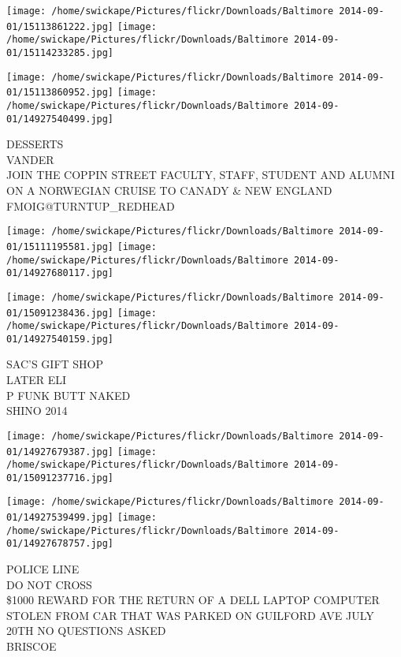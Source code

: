 \documentclass[10pt,letterpaper]{article}
\begin{document}
\texttt{[image: /home/swickape/Pictures/flickr/Downloads/Baltimore 2014-09-01/15113861222.jpg]}
\texttt{[image: /home/swickape/Pictures/flickr/Downloads/Baltimore 2014-09-01/15114233285.jpg]}

\texttt{[image: /home/swickape/Pictures/flickr/Downloads/Baltimore 2014-09-01/15113860952.jpg]}
\texttt{[image: /home/swickape/Pictures/flickr/Downloads/Baltimore 2014-09-01/14927540499.jpg]}

DESSERTS\\
VANDER\\
JOIN THE COPPIN STREET FACULTY, STAFF, STUDENT AND ALUMNI ON A NORWEGIAN CRUISE TO CANADY \& NEW ENGLAND\\
FMOIG@TURNTUP\_REDHEAD\\
\pagebreak

\texttt{[image: /home/swickape/Pictures/flickr/Downloads/Baltimore 2014-09-01/15111195581.jpg]}
\texttt{[image: /home/swickape/Pictures/flickr/Downloads/Baltimore 2014-09-01/14927680117.jpg]}

\texttt{[image: /home/swickape/Pictures/flickr/Downloads/Baltimore 2014-09-01/15091238436.jpg]}
\texttt{[image: /home/swickape/Pictures/flickr/Downloads/Baltimore 2014-09-01/14927540159.jpg]}

SAC'S GIFT SHOP\\
LATER ELI\\
P FUNK BUTT NAKED\\
SHINO 2014\\
\pagebreak

\texttt{[image: /home/swickape/Pictures/flickr/Downloads/Baltimore 2014-09-01/14927679387.jpg]}
\texttt{[image: /home/swickape/Pictures/flickr/Downloads/Baltimore 2014-09-01/15091237716.jpg]}

\texttt{[image: /home/swickape/Pictures/flickr/Downloads/Baltimore 2014-09-01/14927539499.jpg]}
\texttt{[image: /home/swickape/Pictures/flickr/Downloads/Baltimore 2014-09-01/14927678757.jpg]}

POLICE LINE\\
DO NOT CROSS\\
\$1000 REWARD FOR THE RETURN OF A DELL LAPTOP COMPUTER STOLEN FROM CAR THAT WAS PARKED ON GUILFORD AVE JULY 20TH NO QUESTIONS ASKED\\
BRISCOE\\
\pagebreak
\end{document}
